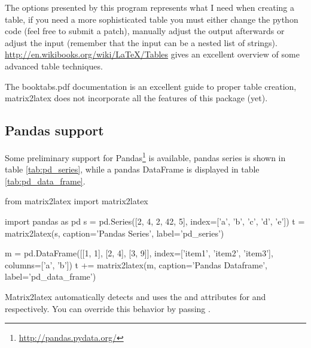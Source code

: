 {{The options presented by this program represents what I need when creating a table,
if you need a more sophisticated table you must either change the python code
(feel free to submit a patch), manually adjust the output afterwards
or adjust the input (remember that the input can be a nested list of strings).
\url{http://en.wikibooks.org/wiki/LaTeX/Tables} gives an excellent overview
of some advanced table techniques.

The booktabs.pdf documentation is an excellent guide to proper table creation,
matrix2latex does not incorporate all the features of this package (yet).

\subsection{Pandas support}
Some preliminary support for Pandas\footnote{\url{http://pandas.pydata.org/}}
is available, pandas series is shown in table \ref{tab:pd_series}, while
a pandas DataFrame is displayed in table \ref{tab:pd_data_frame}.
\begin{pycode}[pandas]
from matrix2latex import matrix2latex
\end{pycode}
\begin{pyblock}[pandas]
import pandas as pd
s = pd.Series([2, 4, 2, 42, 5], 
              index=['a', 'b', 'c', 'd', 'e'])
t = matrix2latex(s, caption='Pandas Series', 
                 label='pd_series')

m = pd.DataFrame([[1, 1], [2, 4], [3, 9]], 
                 index=['item1', 'item2', 'item3'],
                 columns=['a', 'b'])
t += matrix2latex(m, caption='Pandas Dataframe',
                  label='pd_data_frame')
\end{pyblock}

Matrix2latex automatically detects and uses the 
and  attributes for 
 and
 respectively. You can override this behavior by passing
.

}}
